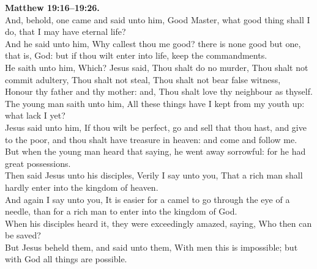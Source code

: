 \documentclass[10pt]{article} %
\begin{document}
{\begin{minipage}[t]{0.45\textwidth}
\textbf{Matthew 19:16--19:26.}\\
And, behold, one came and said unto him, Good Master, what good thing shall I do, that I may have eternal life?\\
And he said unto him, Why callest thou me good? there is none good but one, that is, God: but if thou wilt enter into life, keep the commandments.\\
He saith unto him, Which? Jesus said, Thou shalt do no murder, Thou shalt not commit adultery, Thou shalt not steal, Thou shalt not bear false witness,\\
Honour thy father and thy mother: and, Thou shalt love thy neighbour as thyself.\\
The young man saith unto him, All these things have I kept from my youth up: what lack I yet?\\
Jesus said unto him, If thou wilt be perfect, go and sell that thou hast, and give to the poor, and thou shalt have treasure in heaven: and come and follow me.\\
But when the young man heard that saying, he went away sorrowful: for he had great possessions.\\
Then said Jesus unto his disciples, Verily I say unto you, That a rich man shall hardly enter into the kingdom of heaven.\\
And again I say unto you, It is easier for a camel to go through the eye of a needle, than for a rich man to enter into the kingdom of God.\\
When his disciples heard it, they were exceedingly amazed, saying, Who then can be saved?\\
But Jesus beheld them, and said unto them, With men this is impossible; but with God all things are possible.\\

\end{minipage}}
\vspace*{\fill}
\newpage
\huge%
\vspace*{\fill}
\end{document}
